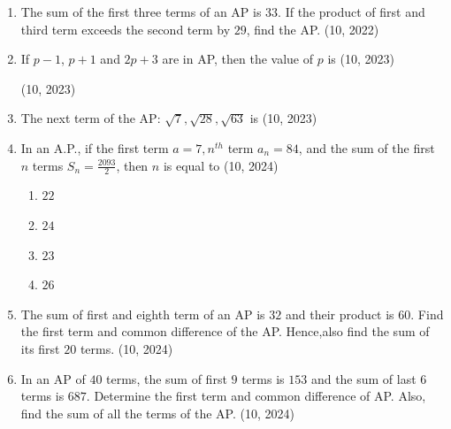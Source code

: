 \begin{enumerate}[label=\thesubsection.\arabic*,ref=\thesubsection.\theenumi,itemsep=1pt]
 \item The sum of the first three terms of an AP is $33$. If the product of first and third term exceeds the second term by $29$, find the AP.
         \hfill (10, 2022)    
 \item If $p-1$, $p+1$ and $2p+3$ are in AP, then the value of $p$ is
        \hfill (10, 2023)
        \begin{enumerate}
      \end{enumerate}
    \hfill (10, 2023) 
\item The next term of the AP: $\sqrt{7}, \sqrt{28}, \sqrt{63}$ is 
\hfill (10, 2023)
    \begin{enumerate}
    \end{enumerate}
\item In an A.P., if the first term $a = 7, n^{th}$ term $a_{n} = 84$, and the sum of the first $n$ terms $S_{n} = \frac{2093}{2}$, then $n$ is equal to
\hfill (10, 2024)
\begin{enumerate}
    \item $22$
    \item $24$
    \item $23$
    \item $26$
\end{enumerate}
\item  The sum of first and eighth term of an AP is $32$ and their product is $60$. Find the first term  and common difference of the AP. Hence,also find the sum of its first $20$ terms.
\hfill (10, 2024)
\item In an AP of $40$ terms, the sum of first $9$ terms is $153$ and the sum of last $6$ terms is $687$.
Determine the first term and common difference of AP. Also, find the sum of all the terms of the AP.
\hfill (10, 2024)
\end{enumerate}
%
